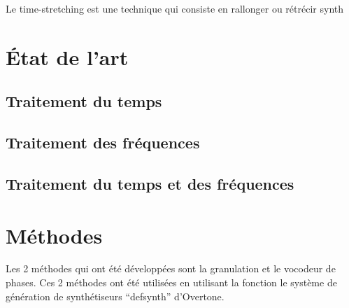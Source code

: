 \documentclass[letterpaper]{article}
\begin{document}
  Le time-stretching est une technique qui consiste en rallonger ou
  rétrécir synth


 

\section{État de l'art}

\subsection{Traitement du temps}

\subsection{Traitement des fréquences}

\subsection{Traitement du temps et des fréquences}

\section{Méthodes}

Les 2 méthodes qui ont été développées sont la granulation et le vocodeur de phases.
Ces 2 méthodes ont été utilisées en utilisant la fonction le système de génération de
synthétiseurs ``defsynth'' d'Overtone.

\end{document}
